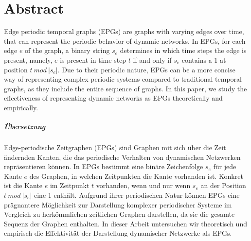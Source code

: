 \chapter*{Abstract}
Edge periodic temporal graphs (EPGs) are graphs with varying edges over time, that can represent the periodic behavior of dynamic networks. In EPGs, for each edge $e$ of the graph, a binary string $s_e$ determines in which time steps the edge is present, namely, $e$ is present in time step $t$ if and only if $s_e$ contains a 1 at position $t~ mod~ |s_e|$. Due to their periodic nature, EPGs can be a more concise way of representing complex periodic systems compared to traditional temporal graphs, as they include the entire sequence of graphs. In this paper, we study the effectiveness of representing dynamic networks as EPGs theoretically and empirically.

\paragraph{Übersetzung}
Edge-periodische Zeitgraphen (EPGs) sind Graphen mit sich über die Zeit ändernden Kanten, die das periodische Verhalten von dynamischen Netzwerken repräsentieren können. In EPGs bestimmt eine binäre Zeichenfolge $s_e$ für jede Kante $e$ des Graphen, in welchen Zeitpunkten die Kante vorhanden ist. Konkret ist die Kante $e$ im Zeitpunkt $t$ vorhanden, wenn und nur wenn $s_e$ an der Position $t~ mod~ |s_e|$ eine 1 enthält. Aufgrund ihrer periodischen Natur können EPGs eine prägnantere Möglichkeit zur Darstellung komplexer periodischer Systeme im Vergleich zu herkömmlichen zeitlichen Graphen darstellen, da sie die gesamte Sequenz der Graphen enthalten. In dieser Arbeit untersuchen wir theoretisch und empirisch die Effektivität der Darstellung dynamischer Netzwerke als EPGs.